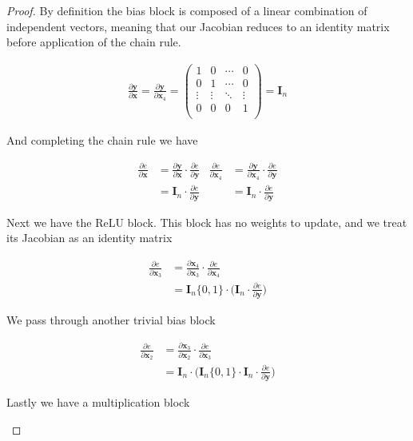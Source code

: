 \documentclass[11pt]{article}
\newcommand{\pd}{\partial}
\newcommand{\bs}{\boldsymbol}
\begin{document}
\begin{proof}
	By definition the bias block is composed of a linear combination of
	independent vectors, meaning that our Jacobian reduces to an identity
	matrix before application of the chain rule.

	\begin{align}
		\frac{\pd \bs{y}}{\pd\bs{x}} =
		\frac{\pd \bs{y}}{\pd\bs{x}_4} =
		\begin{pmatrix}
			1 & 0 & \cdots & 0 \\
			0 & 1 & \cdots & 0 \\
			\vdots & \vdots & \ddots & \vdots \\
			0 & 0 & 0 & 1 \\
		\end{pmatrix} =
		\bs{I}_n
	\end{align}

	And completing the chain rule we have

	\begin{align}
		\frac{\pd e}{\pd\bs{x}} &=
		\frac{\pd \bs{y}}{\pd\bs{x}}\cdot\frac{\pd e}{\pd \bs{y}}
		&
		\frac{\pd e}{\pd\bs{x}_4} &=
		\frac{\pd \bs{y}}{\pd\bs{x}_4}\cdot\frac{\pd e}{\pd \bs{y}}
		\\
		&= \bs{I}_n\cdot\frac{\pd e}{\pd \bs{y}}
		&
		&=\bs{I}_n\cdot\frac{\pd e}{\pd \bs{y}}
	\end{align}

	Next we have the ReLU block. This block has no weights to update, and we
	treat its Jacobian as an identity matrix

	\begin{align}
		\frac{\pd e}{\pd\bs{x}_3} &=
		\frac{\pd \bs{x}_4}{\pd\bs{x}_3}\cdot\frac{\pd e}{\pd \bs{x}_4}
		\\
		&=\bs{I}_n\{0, 1\}\cdot
			\bigg(\bs{I}_n\cdot\frac{\pd e}{\pd \bs{y}}\bigg)
	\end{align}

	We pass through another trivial bias block

	\begin{align}
		\frac{\pd e}{\pd\bs{x}_2} &=
		\frac{\pd \bs{x}_3}{\pd\bs{x}_2}\cdot\frac{\pd e}{\pd \bs{x}_3}
		\\
		&=\bs{I}_n \cdot \bigg(\bs{I}_n\{0, 1\}\cdot
			\bs{I}_n\cdot\frac{\pd e}{\pd \bs{y}}\bigg)
	\end{align}

	Lastly we have a multiplication block

	\begin{figure}[H]
	\centering
	\begin{tikzpicture}


\end{tikzpicture}
\end{figure}
\end{proof}
\end{document}
